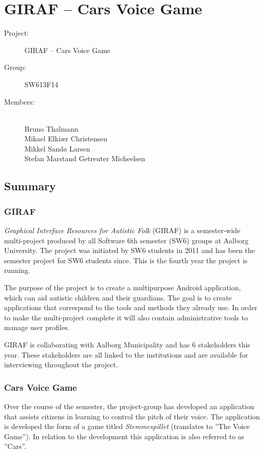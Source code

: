 \documentclass[a4paper,12pt,english]{article}
\begin{document}
\section*{GIRAF -- Cars Voice Game}

\begin{description}
\item[Project:] GIRAF -- Cars Voice Game
\item[Group:] SW613F14
\item[Members:] ~ \\
	Bruno Thalmann \\
	Mikael Elki\ae r Christensen \\
	Mikkel Sand\o{} Larsen \\
	Stefan Marstand Getreuter Micheelsen
\end{description}

\subsection*{Summary}

\subsubsection*{GIRAF}
\textit{Graphical Interface Resources for Autistic Folk} (GIRAF) is a semester-wide multi-project produced by all Software 6th semester (SW6) groups at Aalborg University.
The project was initiated by SW6 students in 2011 and has been the semester project for SW6 students since.
This is the fourth year the project is running.

The purpose of the project is to create a multipurpose Android application, which can aid autistic children and their guardians.
The goal is to create applications that correspond to the tools and methods they already use.
In order to make the multi-project complete it will also contain administrative tools to manage user profiles.

GIRAF is collaborating with Aalborg Municipality and has 6 stakeholders this year.
These stakeholders are all linked to the institutions and are available for interviewing throughout the project.

\subsubsection*{Cars Voice Game}
Over the course of the semester, the project-group has developed an application that assists citizens in learning to control the pitch of their voice.
The application is developed the form of a game titled \textit{Stemmespillet} (translates to ''The Voice Game'').
In relation to the development this application is also referred to as ''Cars''.
\end{document}
